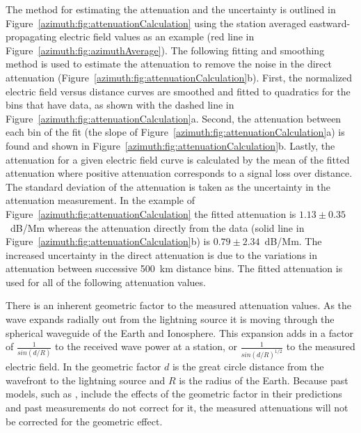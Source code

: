 The method for estimating the attenuation and the uncertainty is outlined in Figure~\ref{azimuth:fig:attenuationCalculation} using the station averaged eastward-propagating electric field values as an example (red line in Figure~\ref{azimuth:fig:azimuthAverage}).
The following fitting and smoothing method is used to estimate the attenuation to remove the noise in the direct attenuation (Figure~\ref{azimuth:fig:attenuationCalculation}b). 
First, the normalized electric field versus distance curves are smoothed and fitted to quadratics for the bins that have data, as shown with the dashed line in Figure~\ref{azimuth:fig:attenuationCalculation}a.
Second, the attenuation between each bin of the fit (the slope of Figure~\ref{azimuth:fig:attenuationCalculation}a) is found and shown in Figure~\ref{azimuth:fig:attenuationCalculation}b.
Lastly, the attenuation for a given electric field curve is calculated by the mean of the fitted attenuation where positive attenuation corresponds to a signal loss over distance.
The standard deviation of the attenuation is taken as the uncertainty in the attenuation measurement.
In the example of Figure~\ref{azimuth:fig:attenuationCalculation} the fitted attenuation is $1.13 \pm 0.35$~dB/Mm whereas the attenuation directly from the data (solid line in Figure~\ref{azimuth:fig:attenuationCalculation}b) is $0.79 \pm 2.34$~dB/Mm.
The increased uncertainty in the direct attenuation is due to the variations in attenuation between successive 500~km distance bins.
The fitted attenuation is used for all of the following attenuation values.

There is an inherent geometric factor to the measured attenuation values.
As the wave expands radially out from the lightning source it is moving through the spherical waveguide of the Earth and Ionosphere.
This expansion adds in a factor of $\frac{1}{sin(d/R)}$ to the received wave power at a station, or $\frac{1}{sin(d/R)^{1/2}}$ to the measured electric field.
In the geometric factor $d$ is the great circle distance from the wavefront to the lightning source and $R$ is the radius of the Earth.
Because past models, such as \citet{Wait1960a}, include the effects of the geometric factor in their predictions and past measurements do not correct for it, the measured attenuations will not be corrected for the geometric effect.


